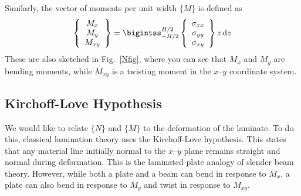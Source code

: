 \documentclass[11pt]{article}
\begin{document}
Similarly, the vector of moments per unit width $\{M\}$ is defined as
\begin{equation}
   \left\{ \begin{array}{c}
     M_x \\ M_y \\ M_{xy}
   \end{array} \right\}
   = \bigintss_{-H/2}^{H/2} 
    \left\{ \begin{array}{c}
           \sigma_{xx}  \\  \sigma_{yy}  \\   \sigma_{xy}
           \end{array} \right\}
      z \ud z
  \label{Mdef}
\end{equation}
These are also sketched in Fig.~\ref{Nfig}, where you can see that $M_x$ and $M_y$ are bending moments, while $M_{xy}$ is a twisting moment in the $x$--$y$ coordinate system.  



\subsection*{Kirchoff-Love Hypothesis}

We would like to relate $\{ N \}$ and $\{ M \}$ to the deformation of the laminate.  To do this, classical lamination theory uses the Kirchoff-Love hypothesis.  This states that any material line initially normal to the $x$--$y$ plane remains straight and normal during deformation.  This is the laminated-plate analogy of slender beam theory.  However, while both a plate and a beam can bend in response to $M_x$, a plate can also bend in response to $M_y$ and twist in response to $M_{xy}$.  
\end{document}
